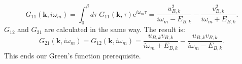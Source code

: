 \begin{equation}
G_{11}(\mathbf{k},i\omega_m) = \int_0^\beta d\tau \; G_{11}(\mathbf{k},\tau) \text{e}^{i\omega_m\tau} = \frac{u_{B,k}^2}{i\omega_m-E_{B,k}}-\frac{v_{B,k}^2}{i\omega_m+E_{B,k}}. 
\end{equation}
$G_{12}$ and $G_{21}$ are calculated in the same way. The result is: 
\begin{equation}
G_{21}(\mathbf{k},i\omega_m) = G_{12}(\mathbf{k},i\omega_m) = \frac{u_{B,k}v_{B,k}}{i\omega_m+E_{B,k}}-\frac{u_{B,k}v_{B,k}}{i\omega_m-E_{B,k}}. 
\end{equation}
This ends our Green's function prerequisite.